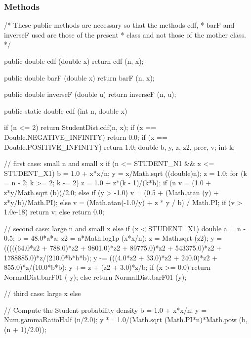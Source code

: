 \subsubsection* {Methods}

\begin{code}\begin{hide}
  /*  These public methods are necessary so that the methods cdf,
   *  barF and inverseF used are those of the present
   *  class and not those of the mother class.
   */

   public double cdf (double x) {
      return cdf (n, x);
   }

   public double barF (double x) {
      return barF (n, x);
   }

   public double inverseF (double u) {
      return inverseF (n, u);
   }\end{hide}

   public static double cdf (int n, double x)\begin{hide} {
      if (n <= 2)
         return StudentDist.cdf(n, x);
      if (x == Double.NEGATIVE_INFINITY)
           return 0.0;
      if (x == Double.POSITIVE_INFINITY)
           return 1.0;
      double b, y, z, z2, prec, v;
      int k;

      // first case: small n and small x
      if (n <= STUDENT_N1 && x <= STUDENT_X1) {
         b = 1.0 + x*x/n;
         y = x/Math.sqrt ((double)n);
         z = 1.0;
         for (k = n - 2; k >= 2; k -= 2)
            z = 1.0 + z*(k - 1)/(k*b);
         if (n %
               v = (1.0 + z*y/Math.sqrt (b))/2.0;
         } else {
            if (y > -1.0)
               v = (0.5 + (Math.atan (y) + z*y/b)/Math.PI);
            else
               v = (Math.atan(-1.0/y) + z * y / b) / Math.PI;
         }
         if (v > 1.0e-18)
            return v;
         else
            return 0.0;
      }

      // second case: large n and small x
      else if (x < STUDENT_X1) {
         double a = n - 0.5;
         b = 48.0*a*a;
         z2 = a*Math.log1p (x*x/n);
         z = Math.sqrt (z2);
         y = (((((64.0*z2 + 788.0)*z2 + 9801.0)*z2 + 89775.0)*z2 +
               543375.0)*z2 + 1788885.0)*z/(210.0*b*b*b);
         y -= (((4.0*z2 + 33.0)*z2 + 240.0)*z2 +  855.0)*z/(10.0*b*b);
         y += z + (z2 + 3.0)*z/b;
         if (x >= 0.0)
            return NormalDist.barF01 (-y);
         else
            return NormalDist.barF01 (y);
      }

      // third case: large x
      else {
         // Compute the Student probability density
         b = 1.0 + x*x/n;
         y = Num.gammaRatioHalf (n/2.0);
         y *= 1.0/(Math.sqrt (Math.PI*n)*Math.pow (b, (n + 1)/2.0));

}
\end{hide}
\end{code}
